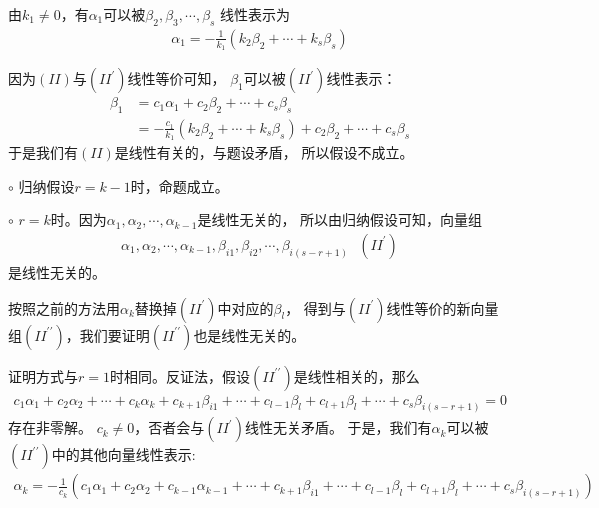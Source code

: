 \documentclass{article}
\begin{document}
\begin{itemize}
        由$k_1 \neq 0$，有$\alpha_1$可以被$\beta_2, \beta_3, \cdots, \beta_s$
        线性表示为
        \begin{align*}
          \alpha_1 = - \frac{1}{k_1} (k_2 \beta_2 + \cdots + k_s \beta_s)
        \end{align*}

        因为$(II)$与$(II^\prime)$线性等价可知，
        $\beta_1$可以被$(II^\prime)$线性表示：
        \begin{align*}
          \beta_1 & = c_1 \alpha_1 + c_2 \beta_2 + \cdots + c_s \beta_s                                           \\
                  & = - \frac{c_1}{k_1} (k_2 \beta_2 + \cdots + k_s \beta_s) + c_2 \beta_2 + \cdots + c_s \beta_s
        \end{align*}
        于是我们有$(II)$是线性有关的，与题设矛盾，
        所以假设不成立。

        $\circ$ 归纳假设$r = k - 1$时，命题成立。

        $\circ$ $r = k$时。因为$\alpha_1, \alpha_2, \cdots, \alpha_{k - 1}$是线性无关的，
        所以由归纳假设可知，向量组
        \begin{align*}
          \alpha_1, \alpha_2, \cdots, \alpha_{k - 1}, \beta_{i1}, \beta_{i2}, \cdots, \beta_{i(s - r + 1)} \ \ \ (II^\prime)
        \end{align*}
        是线性无关的。

        按照之前的方法用$\alpha_k$替换掉$(II^\prime)$中对应的$\beta_l$，
        得到与$(II^\prime)$线性等价的新向量组$(II^{\prime\prime})$，我们要证明$(II^{\prime\prime})$也是线性无关的。

        证明方式与$r = 1$时相同。反证法，假设$(II^{\prime\prime})$是线性相关的，那么
        \begin{align*}
          c_1 \alpha_1 + c_2 \alpha_2 + \cdots + c_k \alpha_k
          + c_{k + 1} \beta_{i1} + \cdots + c_{l - 1} \beta_{l}
          + c_{l + 1} \beta_{l} + \cdots
          + c_s \beta_{i(s - r + 1)} = 0
        \end{align*}
        存在非零解。
        $c_k \neq 0$，否者会与$(II^\prime)$线性无关矛盾。
        于是，我们有$\alpha_k$可以被$(II^{\prime\prime})$中的其他向量线性表示:
        \begin{align*}
          \alpha_k = - \frac{1}{c_k} (c_1 \alpha_1 + c_2 \alpha_2 + c_{k-1} \alpha_{k-1} + \cdots + c_{k + 1} \beta_{i1} + \cdots + c_{l - 1} \beta_{l}
          + c_{l + 1} \beta_{l} + \cdots
          + c_s \beta_{i(s - r + 1)})
        \end{align*}


\end{itemize}
\end{document}
